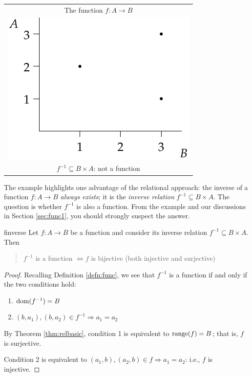 \begin{example}[lower separated=false, sidebyside, sidebyside align=top seam, sidebyside gap=0pt, righthand width=0.33\linewidth]{}{}
\begin{tabular}{@{}c@{}}
		The function $f:A\to B$\\[6pt]
		\includegraphics{relations-19-reln1}\\
		$f^{-1}\subseteq B\times A$: not a function
	\end{tabular}
\end{example}

The example highlights one advantage of the relational approach: the inverse of a function $f:A\to B$ \emph{always exists}; it is the \emph{inverse relation} $f^{-1}\subseteq B\times A$. The question is whether $f^{-1}$ is also a function. From the example and our discussions in Section \ref{sec:func1}, you should strongly suspect the answer.

\begin{thm}{}{finverse}
	Let $f:A\to B$ be a function and consider its inverse relation $f^{-1}\subseteq B\times A$. Then
	\begin{quote}
		$f^{-1}$ is a function $\iff f$ is bijective (both injective and surjective)
	\end{quote} 
\end{thm}

\begin{proof}
	Recalling Definition \ref{defn:func}, we see that $f^{-1}$ is a function if and only if the two conditions hold:
	\begin{enumerate}
	  \item $\operatorname{dom}(f^{-1})=B$
	  \item $(b,a_1),(b,a_2)\in f^{-1}\Longrightarrow a_1=a_2$
	\end{enumerate}
	By Theorem \ref{thm:relbasic}, condition 1 is equivalent to $\operatorname{range}(f)=B$; that is, $f$ is surjective.\par
	Condition 2 is equivalent to $(a_1,b),(a_2,b)\in f\Longrightarrow a_1=a_2$: i.e., $f$ is injective.
\end{proof}
 

